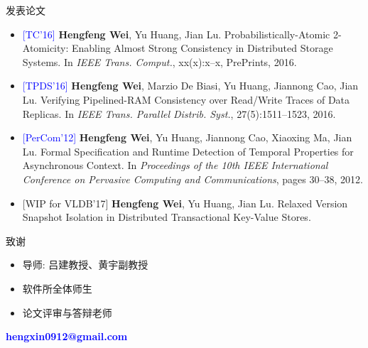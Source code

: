 \begin{frame}{发表论文}
  \begin{itemize}
	\item \textcolor{blue}{[TC'16]} {\bf Hengfeng Wei}, Yu Huang, Jian Lu. 
	  Probabilistically-Atomic 2-Atomicity: Enabling Almost Strong Consistency in Distributed Storage Systems. 
	  In {\it IEEE Trans. Comput.}, xx(x):x--x, PrePrints, 2016.
	\item \textcolor{blue}{[TPDS'16]} {\bf Hengfeng Wei}, Marzio De Biasi, Yu Huang, Jiannong Cao, Jian Lu. 
	  Verifying Pipelined-RAM Consistency over Read/Write Traces of Data Replicas.
	  In {\it IEEE Trans. Parallel Distrib. Syst.}, 27(5):1511--1523, 2016.
	\item \textcolor{blue}{[PerCom'12]} {\bf Hengfeng Wei}, Yu Huang, Jiannong Cao, Xiaoxing Ma, Jian Lu. 
	  Formal Specification and Runtime Detection of Temporal Properties for Asynchronous Context. 
	  In {\it Proceedings of the 10th IEEE International Conference on Pervasive Computing and Communications},
	  pages 30--38, 2012.
	\item \textcolor{blue!50!gray}{[WIP for VLDB'17]} {\bf Hengfeng Wei}, Yu Huang, Jian Lu.
	  Relaxed Version Snapshot Isolation in Distributed Transactional Key-Value Stores. 
  \end{itemize}
\end{frame}
\begin{frame}{致谢}
  \begin{itemize}
	\setlength{\itemsep}{15pt}
	\item 导师: 吕建教授、黄宇副教授
	\item 软件所全体师生
	\item 论文评审与答辩老师
  \end{itemize}
\end{frame}
\begin{frame}[noframenumbering]
  \vspace{-0.8cm}
  \begin{center}
    \textcolor{blue}{\bf \large hengxin0912@gmail.com}
  \end{center}
  \vspace{-0.5cm}
\end{frame}
